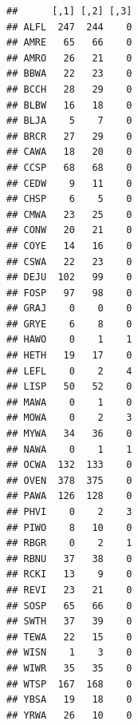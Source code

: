 \documentclass[12pt,]{book}
\newenvironment{Shaded}{\begin{snugshade}}{\end{snugshade}}
\newcommand{\CommentTok}[1]{\textcolor[rgb]{0.56,0.35,0.01}{\textit{#1}}}
\newcommand{\ControlFlowTok}[1]{\textcolor[rgb]{0.13,0.29,0.53}{\textbf{#1}}}
\newcommand{\DecValTok}[1]{\textcolor[rgb]{0.00,0.00,0.81}{#1}}
\newcommand{\FloatTok}[1]{\textcolor[rgb]{0.00,0.00,0.81}{#1}}
\newcommand{\KeywordTok}[1]{\textcolor[rgb]{0.13,0.29,0.53}{\textbf{#1}}}
\newcommand{\NormalTok}[1]{#1}
\newcommand{\OperatorTok}[1]{\textcolor[rgb]{0.81,0.36,0.00}{\textbf{#1}}}
\newcommand{\StringTok}[1]{\textcolor[rgb]{0.31,0.60,0.02}{#1}}
\begin{document}
\begin{Shaded}
\end{Shaded}

\begin{verbatim}
##      [,1] [,2] [,3]
## ALFL  247  244    0
## AMRE   65   66    0
## AMRO   26   21    0
## BBWA   22   23    0
## BCCH   28   29    0
## BLBW   16   18    0
## BLJA    5    7    0
## BRCR   27   29    0
## CAWA   18   20    0
## CCSP   68   68    0
## CEDW    9   11    0
## CHSP    6    5    0
## CMWA   23   25    0
## CONW   20   21    0
## COYE   14   16    0
## CSWA   22   23    0
## DEJU  102   99    0
## FOSP   97   98    0
## GRAJ    0    0    0
## GRYE    6    8    0
## HAWO    0    1    1
## HETH   19   17    0
## LEFL    0    2    4
## LISP   50   52    0
## MAWA    0    1    0
## MOWA    0    2    3
## MYWA   34   36    0
## NAWA    0    1    1
## OCWA  132  133    0
## OVEN  378  375    0
## PAWA  126  128    0
## PHVI    0    2    3
## PIWO    8   10    0
## RBGR    0    2    1
## RBNU   37   38    0
## RCKI   13    9    0
## REVI   23   21    0
## SOSP   65   66    0
## SWTH   37   39    0
## TEWA   22   15    0
## WISN    1    3    0
## WIWR   35   35    0
## WTSP  167  168    0
## YBSA   19   18    0
## YRWA   26   10    0
\end{verbatim}
\end{document}
